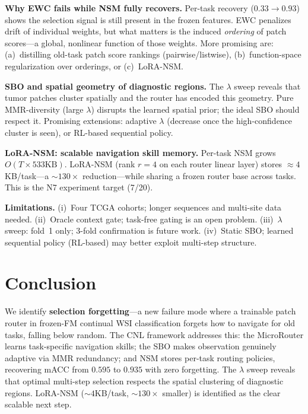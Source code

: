 \documentclass[runningheads]{llncs}
\begin{document}
\noindent\textbf{Why EWC fails while NSM fully recovers.}
Per-task recovery ($0.33\to0.93$) shows the selection signal is still
present in the frozen features. EWC penalizes drift of individual
weights, but what matters is the induced \emph{ordering} of patch
scores---a global, nonlinear function of those weights. More promising
are: (a)~distilling old-task patch score rankings (pairwise/listwise),
(b)~function-space regularization over orderings, or (c)~LoRA-NSM.

\noindent\textbf{SBO and spatial geometry of diagnostic regions.}
The $\lambda$ sweep reveals that tumor patches cluster spatially and
the router has encoded this geometry. Pure MMR-diversity (large
$\lambda$) disrupts the learned spatial prior; the ideal SBO should
respect it. Promising extensions: adaptive $\lambda$ (decrease once
the high-confidence cluster is seen), or RL-based sequential policy.

\noindent\textbf{LoRA-NSM: scalable navigation skill memory.}
\label{sec:lora}
Per-task NSM grows $O(T\!\times\!533\text{KB})$. LoRA-NSM (rank $r{=}4$
on each router linear layer) stores $\approx4$KB/task---a ${\sim}130\times$
reduction---while sharing a frozen router base across tasks. This is
the N7 experiment target (7/20).

\noindent\textbf{Limitations.}
(i)~Four TCGA cohorts; longer sequences and multi-site data needed.
(ii)~Oracle context gate; task-free gating is an open problem.
(iii)~$\lambda$ sweep: fold~1 only; 3-fold confirmation is future work.
(iv)~Static SBO; learned sequential policy (RL-based) may better
exploit multi-step structure.

\section{Conclusion}
\label{sec:conclusion}
We identify \textbf{selection forgetting}---a new failure mode where a
trainable patch router in frozen-FM continual WSI classification
forgets how to navigate for old tasks, falling below random. The CNL
framework addresses this: the MicroRouter learns task-specific
navigation skills; the SBO makes observation genuinely adaptive via
MMR redundancy; and NSM stores per-task routing policies, recovering
mACC from $0.595$ to $\mathbf{0.935}$ with zero forgetting. The
$\lambda$ sweep reveals that optimal multi-step selection respects
the spatial clustering of diagnostic regions. LoRA-NSM (${\sim}4$KB/task,
${\sim}130\times$ smaller) is identified as the clear scalable next step.

\FloatBarrier


\end{document}
